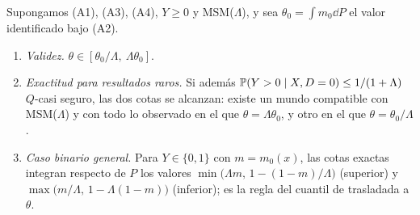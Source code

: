 \begin{proposicion}\label{prop:sensibilidad}
Supongamos (A1), (A3), (A4), $Y\ge0$ y MSM($\Lambda$), y sea $\theta_0=\int m_0\dd P$ el valor identificado bajo (A2).
\begin{enumerate}
  \item \emph{Validez.} $\theta\in[\theta_0/\Lambda,\ \Lambda\theta_0]$.
  \item \emph{Exactitud para resultados raros.} Si además $\mathbb{P}(Y>0\mid X,D=0)\le1/(1+\Lambda)$ $Q$-casi seguro, las dos cotas se alcanzan: existe un mundo compatible con MSM($\Lambda$) y con todo lo observado en el que $\theta=\Lambda\theta_0$, y otro en el que $\theta=\theta_0/\Lambda$.
  \item \emph{Caso binario general.} Para $Y\in\{0,1\}$ con $m=m_0(x)$, las cotas exactas integran respecto de $P$ los valores $\min\bigl(\Lambda m,\,1-(1-m)/\Lambda\bigr)$ (superior) y $\max\bigl(m/\Lambda,\,1-\Lambda(1-m)\bigr)$ (inferior); es la regla del cuantil de \citet{dorn2023} trasladada a $\theta$.
\end{enumerate}
\end{proposicion}
